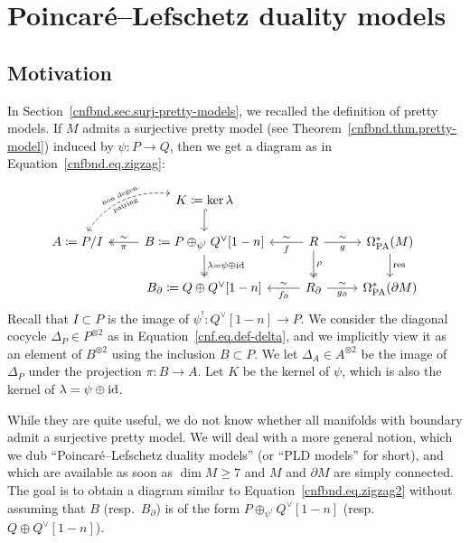 \section{Poincaré--Lefschetz duality models}
\label{cnfbnd.sec.pretty-nice}

\subsection{Motivation}
\label{cnfbnd.sec.motivation}

In Section~\ref{cnfbnd.sec.surj-pretty-models}, we recalled the definition of pretty models.
If $M$ admits a surjective pretty model (see Theorem~\ref{cnfbnd.thm.pretty-model}) induced by $\psi : P \to Q$, then we get a diagram as in Equation~\eqref{cnfbnd.eq.zigzag}:
\begin{equation}
  \label{cnfbnd.eq.zigzag2}
  \begin{tikzcd}
    {} &
    K \coloneqq \ker \lambda
    \ar[d, hook]
    \ar[dl, bend right, dashed, leftrightarrow, "\text{\tiny non degen.}" {sloped,above}, "\text{\tiny pairing}" {sloped,below}]
    \\
    A \coloneqq P/I
    &
    B \coloneqq P \oplus_{\psi^{!}} Q^{\vee}[1-n] \ar[d, "\lambda = \psi \oplus \id", two heads] \ar[l, "\pi", "\sim" swap, two heads]
    & R \ar[l, "f", "\sim" swap] \ar[r, "\sim", "g" swap] \ar[d, "\rho", two heads]
    & \OmPA^{*}(M) \dar{\operatorname{res}} \\
    {}
    & B_{\partial} \coloneqq Q \oplus Q^{\vee}[1-n]
    & R_{\partial} \lar{f_{\partial}}[swap]{\sim} \rar{\sim}[swap]{g_{\partial}}
    & \OmPA^{*}(\partial M)
  \end{tikzcd}
\end{equation}
Recall that $I \subset P$ is the image of $\psi^{!} : Q^{\vee}[1-n] \to P$.
We consider the diagonal cocycle $\Delta_{P} \in P^{\otimes 2}$ as in Equation~\eqref{cnf.eq.def-delta}, and we implicitly view it as an element of $B^{\otimes 2}$ using the inclusion $B \subset P$.
We let $\Delta_{A} \in A^{\otimes 2}$ be the image of $\Delta_{P}$ under the projection $\pi : B \to A$.
Let $K$ be the kernel of $\psi$, which is also the kernel of $\lambda = \psi \oplus \operatorname{id}$.

While they are quite useful, we do not know whether all manifolds with boundary admit a surjective pretty model.
We will deal with a more general notion, which we dub ``Poincaré--Lefschetz duality models'' (or ``PLD models'' for short), and which are available as soon as $\dim M \geq 7$ and $M$ and $\partial M$ are simply connected.
The goal is to obtain a diagram similar to Equation~\eqref{cnfbnd.eq.zigzag2} without assuming that $B$ (resp.\ $B_{\partial}$) is of the form $P \oplus_{\psi^{!}} Q^{\vee}[1-n]$ (resp.\ $Q \oplus Q^{\vee}[1-n]$).

